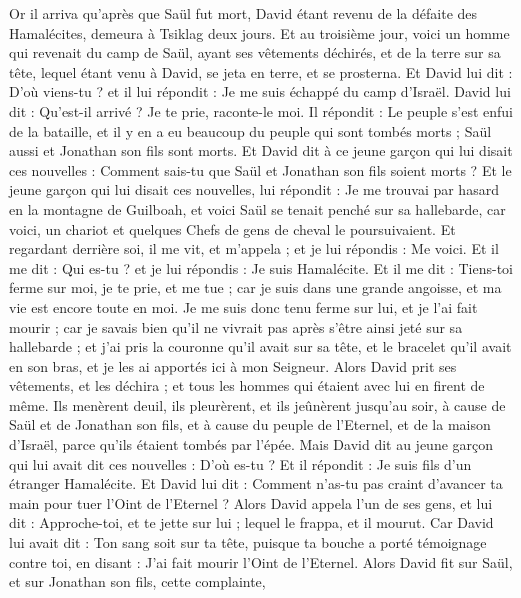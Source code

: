 \BFont
\begin{multicols}{2}
\VerseOne{}Or il arriva qu'après que Saül fut mort, David étant revenu de la défaite des Hamalécites, demeura à Tsiklag deux jours.
Et au troisième jour, voici un homme qui revenait du camp de Saül, ayant ses vêtements déchirés, et de la terre sur sa tête, lequel étant venu à David, se jeta en terre, et se prosterna.
Et David lui dit : D'où viens-tu ? et il lui répondit : Je me suis échappé du camp d'Israël.
David lui dit : Qu'est-il arrivé ? Je te prie, raconte-le moi. Il répondit : Le peuple s'est enfui de la bataille, et il y en a eu beaucoup du peuple qui sont tombés morts ; Saül aussi et Jonathan son fils sont morts.
Et David dit à ce jeune garçon qui lui disait ces nouvelles : Comment sais-tu que Saül et Jonathan son fils soient morts ?
Et le jeune garçon qui lui disait ces nouvelles, lui répondit : Je me trouvai par hasard en la montagne de Guilboah, et voici Saül se tenait penché sur sa hallebarde, car voici, un chariot et quelques Chefs de gens de cheval le poursuivaient.
Et regardant derrière soi, il me vit, et m'appela ; et je lui répondis : Me voici.
Et il me dit : Qui es-tu ? et je lui répondis : Je suis Hamalécite.
Et il me dit : Tiens-toi ferme sur moi, je te prie, et me tue ; car je suis dans une grande angoisse, et ma vie est encore toute en moi.
Je me suis donc tenu ferme sur lui, et je l'ai fait mourir ; car je savais bien qu'il ne vivrait pas après s'être ainsi jeté sur sa hallebarde ; et j'ai pris la couronne qu'il avait sur sa tête, et le bracelet qu'il avait en son bras, et je les ai apportés ici à mon Seigneur.
Alors David prit ses vêtements, et les déchira ; et tous les hommes qui étaient avec lui en firent de même.
Ils menèrent deuil, ils pleurèrent, et ils jeûnèrent jusqu'au soir, à cause de Saül et de Jonathan son fils, et à cause du peuple de l'Eternel, et de la maison d'Israël, parce qu'ils étaient tombés par l'épée.
Mais David dit au jeune garçon qui lui avait dit ces nouvelles : D'où es-tu ? Et il répondit : Je suis fils d'un étranger Hamalécite.
Et David lui dit : Comment n'as-tu pas craint d'avancer ta main pour tuer l'Oint de l'Eternel ?
Alors David appela l'un de ses gens, et lui dit : Approche-toi, et te jette sur lui ; lequel le frappa, et il mourut.
Car David lui avait dit : Ton sang soit sur ta tête, puisque ta bouche a porté témoignage contre toi, en disant : J'ai fait mourir l'Oint de l'Eternel.
Alors David fit sur Saül, et sur Jonathan son fils, cette complainte,

\end{multicols}
